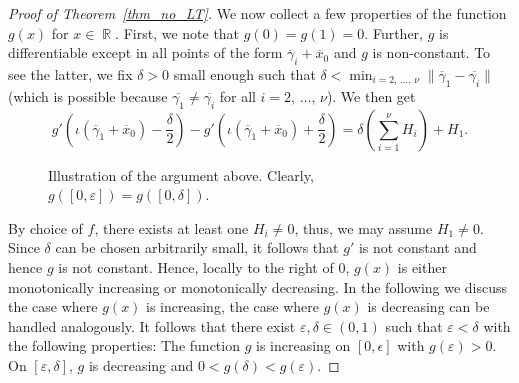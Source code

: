 \documentclass[AHL,Unicode,longabstracts,published]{cedram}
\DeclareMathOperator{\R}{\mathbb{R}}
\begin{document}
\begin{proof}[Proof of Theorem~\ref{thm_no_LT}]
We now collect a few properties of the function $g(x)$ for $x \in \R$. First, we note that $g(0)=g(1) = 0$. Further, $g$ is differentiable except in all points of the form $ \overline{\gamma}_i+ \overline{x}_0$ and $g$ is non-constant. To see the latter, we fix $ \delta > 0$ small enough such that $ \delta < \min_{i=2, \,\ldots,\,\nu} \| \overline{\gamma}_1- \overline{\gamma_i} \|$ (which is possible because $\overline{\gamma_1} \neq \overline{\gamma_i}$ for all $i = 2,\,\ldots,\,\nu$). We then get
\begin{equation*}
g'\left (\iota(\overline{\gamma}_1 + \overline{x}_0) - \frac{\delta}{2} \right) - g'\left (\iota(\overline{\gamma}_1 + \overline{x}_0) + \frac{\delta}{2} \right) = \delta \left(\sum_{i=1}^{\nu} H_i \right) +H_1.
\end{equation*}
\begin{figure}[!htbp]
\centering
{}
\captionsetup{labelformat=empty}
\caption{Illustration of the argument above. Clearly, $g([0,\varepsilon]) = g([0,\delta])$.}\label{fig:einplot}
\end{figure}

\noindent By choice of $f$, there exists at least one $H_i \neq 0$, thus, we may assume $H_1 \neq 0$. Since $\delta$ can be chosen arbitrarily small, it follows that $g'$ is not constant and hence $g$ is not constant. Hence, locally to the right of $0$, $g(x)$ is either monotonically increasing or monotonically decreasing. In the following we discuss the case where $g(x)$ is increasing, the case where $g(x)$ is decreasing can be handled analogously. It follows that there exist $\varepsilon, \delta \in (0,1)$ such that $ \varepsilon < \delta$ with the following properties: The function $g$ is increasing on $[0, \epsilon]$ with $g (\varepsilon) > 0$. On $[\varepsilon, \delta]$, $g$ is decreasing and $ 0 < g(\delta) < g(\varepsilon)$.




\end{proof}
\end{document}
